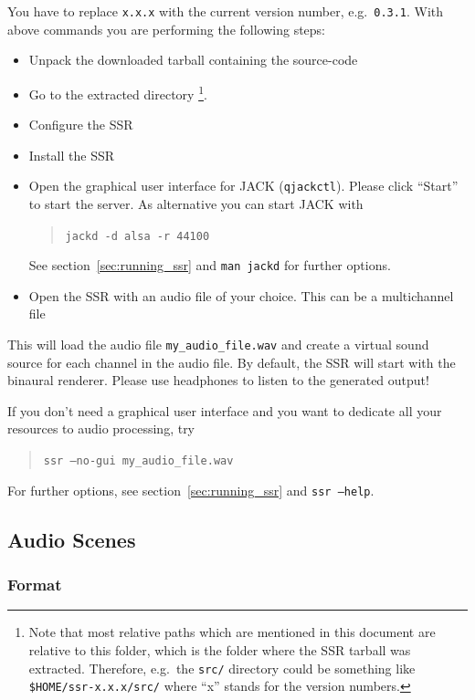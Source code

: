 You have to replace \texttt{x.x.x} with the current version number, e.g.\
\texttt{0.3.1}.
With above commands you are performing the following steps:
\begin{itemize}
  \item Unpack the downloaded tarball containing the source-code
  \item Go to the extracted directory%
    \footnote{Note that most relative paths which are
    mentioned in this document are relative to this folder,
    which is the folder where the SSR tarball was extracted. Therefore,
    e.g.\ the \texttt{src/} directory could be something like
    \texttt{\$HOME/ssr-x.x.x/src/} where ``x'' stands for the 
    version numbers.}.
  \item Configure the SSR
  \item Install the SSR
  \item Open the graphical user interface for JACK (\verb+qjackctl+).
    Please click ``Start'' to start the server.
    As alternative you can start JACK with
    \begin{quote}
    \texttt{jackd -d alsa -r 44100}
    \end{quote}
    See section~\ref{sec:running_ssr} and
    \texttt{man jackd} for further options.
  \item Open the SSR with an audio file of your choice. This can be a
    multichannel file
\end{itemize}
%
This will load the audio file \texttt{my\_audio\_file.wav} and create a virtual
sound source for each channel in the audio file.
By default, the SSR will start with the binaural renderer. Please use headphones
to listen to the generated output!

If you don't need a graphical user interface and you want to dedicate all your
resources to audio processing, try
\begin{quote}
\texttt{ssr --no-gui my\_audio\_file.wav}
\end{quote}
%
For further options, see section~\ref{sec:running_ssr} and \texttt{ssr --help}.

\subsection{Audio Scenes}
\label{sec:audio_scenes}

\subsubsection{Format}

